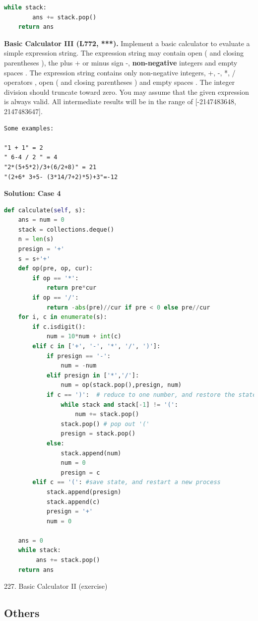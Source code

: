 \documentclass[../main.tex]{subfiles}
\begin{document}
\begin{examples}[resume]
\begin{lstlisting}[language=Python]
    while stack:
        ans += stack.pop()
    return ans
\end{lstlisting}
\item \textbf{Basic Calculator III (L772, ***).} Implement a basic calculator to evaluate a simple expression string. The expression string may contain open ( and closing parentheses ), the plus + or minus sign -, \textbf{non-negative} integers and empty spaces . The expression string contains only non-negative integers, +, -, *, / operators , open ( and closing parentheses ) and empty spaces . The integer division should truncate toward zero. You may assume that the given expression is always valid. All intermediate results will be in the range of [-2147483648, 2147483647].
\begin{lstlisting}[numbers=none]
Some examples:

"1 + 1" = 2
" 6-4 / 2 " = 4
"2*(5+5*2)/3+(6/2+8)" = 21
"(2+6* 3+5- (3*14/7+2)*5)+3"=-12
\end{lstlisting}
\textbf{Solution: Case 4}
\begin{lstlisting}[language=Python]
def calculate(self, s):
    ans = num = 0
    stack = collections.deque()
    n = len(s)
    presign = '+'
    s = s+'+'
    def op(pre, op, cur):
        if op == '*':
            return pre*cur
        if op == '/':
            return -abs(pre)//cur if pre < 0 else pre//cur
    for i, c in enumerate(s):
        if c.isdigit():
            num = 10*num + int(c)
        elif c in ['+', '-', '*', '/', ')']:
            if presign == '-':
                num = -num
            elif presign in ['*','/']:
                num = op(stack.pop(),presign, num)  
            if c == ')':  # reduce to one number, and restore the state
                while stack and stack[-1] != '(':
                    num += stack.pop()
                stack.pop() # pop out '('
                presign = stack.pop()
            else:
                stack.append(num)
                num = 0
                presign = c             
        elif c == '(': #save state, and restart a new process            
            stack.append(presign)
            stack.append(c)
            presign = '+'
            num = 0

    ans = 0
    while stack:
         ans += stack.pop()
    return ans
\end{lstlisting}
\item 227. Basic Calculator II (exercise)
\end{examples}
\subsection{Others}
\end{document}
